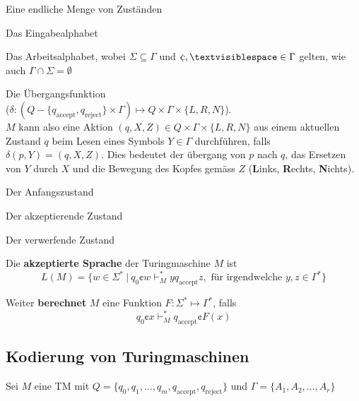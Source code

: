 \documentclass[11pt]{article}
\begin{document}
\begin{description}[labelindent=16pt,style=multiline,leftmargin=4.5cm, noitemsep]
	\item[$Q$:] Eine endliche Menge von Zust{\"a}nden
	\item[$\Sigma$:] Das Eingabealphabet
	\item[$\Gamma$:] Das Arbeitsalphabet, wobei $\Sigma \subseteq \Gamma$ und $\cent, \textvisiblespace \in \Gamma$ gelten, wie auch $\Gamma \cap \Sigma = \emptyset$
	\item[$\delta$:] Die {\"U}bergangsfunktion\\ ($\delta: (Q-\{q_\text{accept}, q_\text{reject}\}\times\Gamma) \mapsto Q\times\Gamma\times\{L,R,N\}$).  \\$M$ kann also eine Aktion $(q, X, Z) \in Q \times \Gamma \times \{L, R, N\}$ aus einem aktuellen Zustand $q$ beim Lesen eines Symbols $Y \in \Gamma$ durchf{\"u}hren, falls $\delta(p, Y) = (q, X, Z)$. Dies bedeutet der {\"u}bergang von $p$ nach $q$, das Ersetzen von $Y$ durch $X$ und die Bewegung des Kopfes gem{\"a}ss $Z$ (\textbf{L}inks, \textbf{R}echts, \textbf{N}ichts).
	\item[$q_0 \in Q$:] Der Anfangszustand
	\item[$q_\text{\normalfont accept} \in Q$:] Der akzeptierende Zustand
	\item[$q_\text{\normalfont reject} \in Q-\{q_\text{\normalfont accept}\}$:] Der verwerfende Zustand
\end{description}

Die \textbf{akzeptierte Sprache} der Turingmaschine $M$ ist
\begin{equation*}
	L(M) = \{w \in \Sigma^*\ |\ q_0\cent w \vdash_M^* yq_\text{accept}z,\text{ f{\"u}r irgendwelche }y,z \in \Gamma^*\}
\end{equation*}

Weiter \textbf{berechnet} $M$ eine Funktion $F:\Sigma^* \mapsto \Gamma^*$, falls
\begin{equation*}
	q_0\cent x \vdash_M^* q_\text{accept}\cent F(x)
\end{equation*}

\subsection{Kodierung von Turingmaschinen}

Sei $M$ eine TM mit $Q = \{q_0, q_1, ..., q_m, q_\text{accept}, q_\text{reject}\}$ und $\Gamma = \{A_1, A_2,...,A_r\}$
\end{document}
